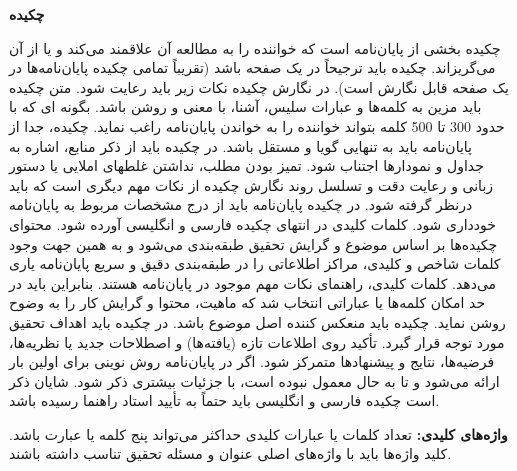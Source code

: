 \thispagestyle{plain}

\setlength{\parskip}{12pt}

{\fontsize{14}{18}\selectfont\textbf{چکیده}}

\vspace{24pt} %

{\fontsize{13}{16}\selectfont
چکیده بخشی از پایان‌نامه است که خواننده را به مطالعه آن علاقمند می‌کند و یا از آن می‌گریزاند.
چکیده باید ترجیحاً در یک صفحه باشد (تقریباً تمامی چکیده پایان‌نامه‌ها در یک صفحه قابل نگارش است).
در نگارش چکیده نکات زیر باید رعایت شود. متن چکیده باید مزین به کلمه‌ها و عبارات سلیس، آشنا، با
معنی و روشن باشد. بگونه ای که با حدود 300 تا 500 کلمه بتواند خواننده را به خواندن پایان‌نامه راغب
نماید. چکیده، جدا از پایان‌نامه باید به تنهایی گویا و مستقل باشد. در چکیده باید از ذکر منابع، اشاره به
جداول و نمودارها اجتناب شود. تمیز بودن مطلب، نداشتن غلطهای املایی یا دستور زبانی و رعایت دقت و
تسلسل روند نگارش چکیده از نکات مهم دیگری است که باید درنظر گرفته شود. در چکیده پایان‌نامه باید از
درج مشخصات مربوط به پایان‌نامه خودداری شود. کلمات کلیدی در انتهای چکیده فارسی و انگلیسی آورده
شود. محتوای چکیده‌ها بر اساس موضوع و گرایش تحقیق طبقه‌بندی می‌شود و به همین جهت وجود کلمات
شاخص و کلیدی، مراکز اطلاعاتی را در طبقه‌بندی دقیق و سریع پایان‌نامه یاری می‌دهد. کلمات کلیدی،
راهنمای نکات مهم موجود در پایان‌نامه هستند. بنابراین باید در حد امکان کلمه‌ها یا عباراتی انتخاب شد که
ماهیت، محتوا و گرایش کار را به وضوح روشن نماید. چکیده باید منعکس کننده اصل موضوع باشد. در
چکیده باید اهداف تحقیق مورد توجه قرار گیرد. تأکید روی اطلاعات تازه (یافته‌ها) و اصطلاحات جدید یا
نظریه‌ها، فرضیه‌ها، نتایج و پیشنهادها متمرکز شود. اگر در پایان‌نامه روش نوینی برای اولین بار ارائه می‌شود
و تا به حال معمول نبوده است، با جزئیات بیشتری ذکر شود. شایان ذکر است چکیده فارسی و انگلیسی
باید حتماً به تأیید استاد راهنما رسیده باشد.
}

\vspace{12pt}

{\fontsize{13}{16}\selectfont\textbf{واژه‌های کلیدی:}}
{\fontsize{13}{16}\selectfont
تعداد کلمات یا عبارات کلیدی حداکثر می‌تواند پنج کلمه یا عبارت باشد. کلید واژه‌ها
باید با واژه‌های اصلی عنوان و مسئله تحقیق تناسب داشته باشند.
}
